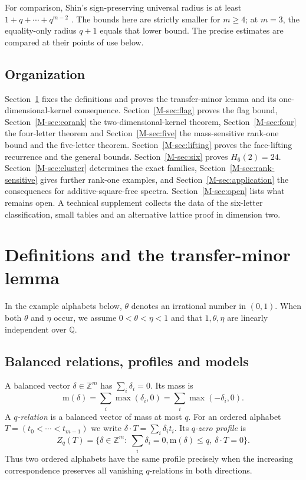 \documentclass[11pt,reqno]{amsart}
\theoremstyle{plain}
\theoremstyle{definition}
\theoremstyle{plain}
\newcommand{\Z}{\mathbb{Z}}
\newcommand{\Q}{\mathbb{Q}}
\newcommand{\mass}{\mathrm{m}}
\theoremstyle{plain}
\theoremstyle{plain}
\theoremstyle{plain}
\theoremstyle{plain}
\theoremstyle{plain}
\theoremstyle{definition}
\theoremstyle{definition}
\theoremstyle{definition}
\theoremstyle{plain}
\begin{document}
For comparison, Shin's sign-preserving universal radius is at least
$1+q+\cdots+q^{m-2}$ \cite[Theorem~7.9]{M-Shin26}. The bounds here are
strictly smaller for $m\ge4$; at $m=3$, the equality-only radius $q+1$
equals that lower bound. The precise estimates are compared at their
points of use below.

\subsection{Organization}
Section~\ref{M-sec:prelim} fixes the definitions and proves the transfer-minor
lemma and its one-dimensional-kernel consequence. Section~\ref{M-sec:flag}
proves the flag bound, Section~\ref{M-sec:corank} the two-dimensional-kernel
theorem, Section~\ref{M-sec:four} the four-letter theorem and
Section~\ref{M-sec:five} the mass-sensitive rank-one bound and the five-letter
theorem. Section~\ref{M-sec:lifting}
proves the face-lifting recurrence and the general bounds.
Section~\ref{M-sec:six} proves $H_6(2)=24$. Section~\ref{M-sec:cluster}
determines the exact families, Section~\ref{M-sec:rank-sensitive} gives
further rank-one examples, and
Section~\ref{M-sec:application} the consequences for additive-square-free
spectra. Section~\ref{M-sec:open} lists what remains open. A technical
supplement collects the data of the six-letter classification, small tables and an alternative lattice proof in dimension two.

\section{Definitions and the transfer-minor lemma}\label{M-sec:prelim}

In the example alphabets below, $\theta$ denotes an irrational number
in $(0,1)$. When both $\theta$ and $\eta$ occur, we assume
$0<\theta<\eta<1$ and that $1,\theta,\eta$ are linearly independent
over $\Q$.


\subsection{Balanced relations, profiles and models}
A balanced vector $\delta\in\Z^m$ has $\sum_i\delta_i=0$. Its mass is
\[
 \mass(\delta)=\sum_i\max(\delta_i,0)=\sum_i\max(-\delta_i,0).
\]
A \emph{$q$-relation} is a balanced vector of mass at most $q$. For an ordered
alphabet $T=(t_0<\cdots<t_{m-1})$ we write $\delta\cdot T=\sum_i\delta_it_i$.
Its \emph{$q$-zero profile} is
\[
 Z_q(T)=\{\delta\in\Z^m:\ \textstyle\sum_i\delta_i=0,
               \mass(\delta)\le q,\ \delta\cdot T=0\}.
\]
Thus two ordered alphabets have the same profile precisely when the
increasing correspondence preserves all vanishing $q$-relations in both directions.
\end{document}
